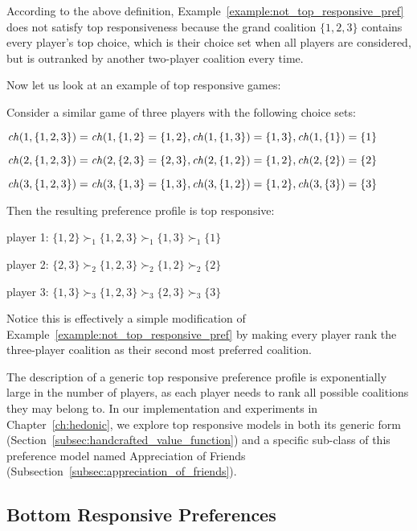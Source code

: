 According to the above definition, Example~\ref{example:not_top_responsive_pref}
does not satisfy top responsiveness because the grand coalition $\{1, 2, 3\}$
contains every player's top choice, which is their choice set when all players
are considered, but is outranked by another two-player coalition every time.

Now let us look at an example of top responsive games:

\begin{example}
\label{example:top_responsive_pref}
  Consider a similar game of three players with the following choice sets:
  
  $\mathit{ch}(1, \{1, 2, 3\}) = \mathit{ch}(1, \{1, 2\} = \{1, 2\},
   \mathit{ch}(1, \{1, 3\}) = \{1, 3\}, \mathit{ch}(1, \{1\}) = \{1\}$

  $\mathit{ch}(2, \{1, 2, 3\}) = \mathit{ch}(2, \{2, 3\} = \{2, 3\},
   \mathit{ch}(2, \{1, 2\}) = \{1, 2\}, \mathit{ch}(2, \{2\}) = \{2\}$

  $\mathit{ch}(3, \{1, 2, 3\}) = \mathit{ch}(3, \{1, 3\} = \{1, 3\},
   \mathit{ch}(3, \{1, 2\}) = \{1, 2\}, \mathit{ch}(3, \{3\}) = \{3\}$
  
  Then the resulting preference profile is top responsive:

  player 1: $\{1, 2\} \succ_1 \{1, 2, 3\} \succ_1 \{1, 3\} \succ_1  \{1\}$

  player 2: $\{2, 3\} \succ_2 \{1, 2, 3\} \succ_2 \{1, 2\} \succ_2  \{2\}$

  player 3: $\{1, 3\} \succ_3 \{1, 2, 3\} \succ_3 \{2, 3\} \succ_3  \{3\}$
  
  Notice this is effectively a simple modification of
  Example~\ref{example:not_top_responsive_pref} by making every player rank
  the three-player coalition as their second most preferred coalition.
\end{example}

The description of a generic top responsive preference profile is exponentially
large in the number of players, as each player needs to rank all possible
coalitions they may belong to.
In our implementation and experiments in Chapter~\ref{ch:hedonic}, we explore
top responsive models in both its generic form
(Section~\ref{subsec:handcrafted_value_function}) and a specific sub-class of
this preference model named Appreciation of Friends
(Subsection~\ref{subsec:appreciation_of_friends}).

\subsection{Bottom Responsive Preferences}
\label{subsec:bottom_responsive_preferences}

